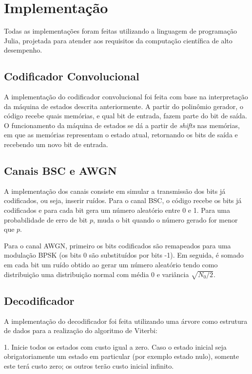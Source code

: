 \section{Implementação}

Todas as implementações foram feitas utilizando a linguagem de programação Julia, projetada para atender aos requisitos da computação científica de alto desempenho.

\subsection{Codificador Convolucional}

A implementação do codificador convolucional foi feita com base na interpretação da máquina de estados descrita anteriormente. A partir do polinômio gerador, o código recebe quais memórias, e qual bit de entrada, fazem parte do bit de saída. O funcionamento da máquina de estados se dá a partir de \textit{shifts} nas memórias, em que as memórias representam o estado atual, retornando os bits de saída e recebendo um novo bit de entrada.

\subsection{Canais BSC e AWGN}

A implementação dos canais consiste em simular a transmissão dos bits já codificados, ou seja, inserir ruídos. Para o canal BSC, o código recebe os bits já codificados e para cada bit gera um número aleatório entre 0 e 1. Para uma probabilidade de erro de bit $p$, muda o bit quando o número gerado for menor que $p$.

Para o canal AWGN, primeiro os bits codificados são remapeados para uma modulação BPSK (os bits 0 são substituídos por bits -1). Em seguida, é somado em cada bit um ruído obtido ao gerar um número aleatório tendo como distribuição uma distribuição normal com média 0 e variância $\sqrt{N_{0}/2}$.

\subsection{Decodificador}

A implementação do decodificador foi feita utilizando uma árvore como estrutura de dados para a realização do algoritmo de Viterbi:

1. Inicie todos os estados com custo igual a zero. Caso o estado inicial seja obrigatoriamente um estado em particular (por exemplo estado nulo), somente este terá custo zero; os outros terão custo inicial infinito.

